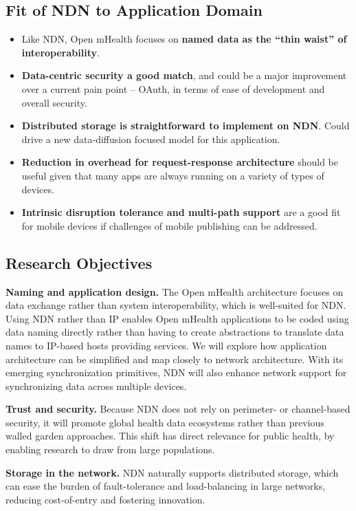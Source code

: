 \subsection{Fit of NDN to Application Domain}

\begin{itemize}
\item Like NDN, Open mHealth  focuses on \textbf{named data as the ``thin waist'' of interoperability}. 
\item \textbf{Data-centric security a good match}, and could be a major improvement over a current pain point – OAuth, in terms of ease of development and overall security.
\item \textbf{Distributed storage is straightforward to implement on NDN}. Could drive a new data-diffusion focused model for this application. 
\item \textbf{Reduction in overhead for request-response architecture} should be useful given that many apps are always running on a variety of types of devices. 
\item \textbf{Intrinsic disruption tolerance and multi-path support} are a good fit for mobile devices if challenges of mobile publishing can be addressed. 
\end{itemize}

\subsection{Research Objectives} 

{\bf Naming and application design.} The Open mHealth architecture focuses on data exchange rather than system interoperability, which is well-suited for NDN. Using NDN rather than IP enables Open mHealth applications to be coded using data naming directly rather than having to create abstractions to translate data names to IP-based hosts providing services. We will explore how application architecture can be simplified and map closely to network architecture. With its emerging synchronization primitives, NDN will also enhance network support for synchronizing data across multiple devices. 

{\bf Trust and security.} Because NDN does not rely on perimeter- or channel-based security, it will promote global health data ecosystems rather than previous walled garden approaches.   This shift has direct relevance for public health, by enabling research to draw from large populations. 

{\bf Storage in the network.} NDN naturally supports distributed storage, which can ease the burden of fault-tolerance and load-balancing in large networks, reducing cost-of-entry and fostering innovation. 


